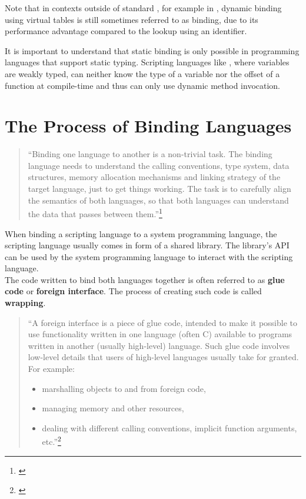 Note that in contexts outside of standard , for example in , dynamic binding using virtual tables is still sometimes referred to as  binding, due to its performance advantage compared to the lookup using an identifier.

It is important to understand that static binding is only possible in programming languages that support static typing. Scripting languages like , where variables are weakly typed, can neither know the type of a variable nor the offset of a function at compile-time and thus can only use dynamic method invocation.

\section{The Process of Binding Languages}

\begin{quotation}
``Binding one language to another is a non-trivial task. The binding language needs to understand the calling conventions, type system, data structures, memory allocation mechanisms and linking strategy of the target language, just to get things working. The task is to carefully align the semantics of both languages, so that both languages can understand the data that passes between them.''\footnote{\citep{RealWorldHaskell}}
\end{quotation}

When binding a scripting language to a system programming language, the scripting language usually comes in form of a shared library. The library's API can be used by the system programming language to interact with the scripting language.\\
The code written to bind both languages together is often referred to as \textbf{glue code} or \textbf{foreign interface}. The process of creating such code is called \textbf{wrapping}.

\begin{quotation}
``A foreign interface is a piece of glue code, intended to make it possible to use functionality written in one language (often C) available to programs written in another (usually high-level) language. Such glue code involves low-level details that users of high-level languages usually take for granted. For example:
\begin{itemize}
\item marshalling objects to and from foreign code,
\item managing memory and other resources,
\item dealing with different calling conventions, implicit function arguments, etc.''\footnote{\citep{FFIScheme}}
\end{itemize}
\end{quotation}

